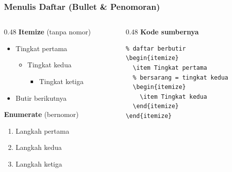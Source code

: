 \begin{frame}[fragile]
  \frametitle{Menulis Daftar (Bullet \& Penomoran)}

  \begin{columns}[T]
    \begin{column}{0.48\textwidth}
      {\small\textbf{Itemize} (tanpa nomor)}
      \begin{itemize}
        \item Tingkat pertama
          \begin{itemize}
            \item Tingkat kedua
              \begin{itemize}
                \item Tingkat ketiga
              \end{itemize}
          \end{itemize}
        \item Butir berikutnya
      \end{itemize}

      \medskip
      {\small\textbf{Enumerate} (bernomor)}
      \begin{enumerate}
        \item Langkah pertama
        \item Langkah kedua
        \item Langkah ketiga
      \end{enumerate}
    \end{column}

    \begin{column}{0.48\textwidth}
      {\small\textbf{Kode sumbernya}}
      \begin{lstlisting}
% daftar berbutir
\begin{itemize}
  \item Tingkat pertama
  % bersarang = tingkat kedua
  \begin{itemize}
    \item Tingkat kedua
  \end{itemize}
\end{itemize}


\end{lstlisting}
\end{column}
\end{columns}
\end{frame}
